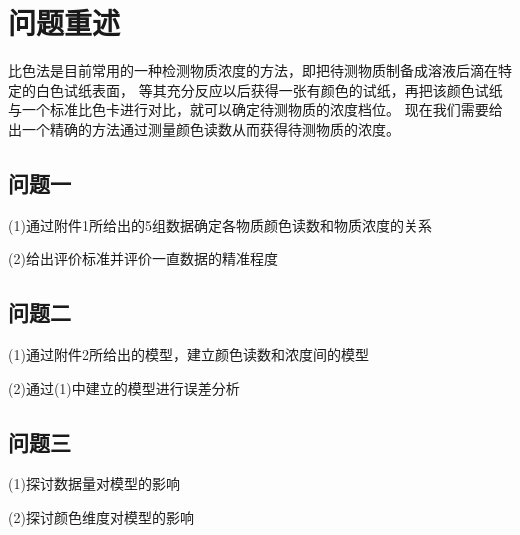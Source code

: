 \section{问题重述}
比色法是目前常用的一种检测物质浓度的方法，即把待测物质制备成溶液后滴在特定的白色试纸表面，
等其充分反应以后获得一张有颜色的试纸，再把该颜色试纸与一个标准比色卡进行对比，就可以确定待测物质的浓度档位。
现在我们需要给出一个精确的方法通过测量颜色读数从而获得待测物质的浓度。
\subsection{问题一}
(1)通过附件1所给出的5组数据确定各物质颜色读数和物质浓度的关系

(2)给出评价标准并评价一直数据的精准程度

\subsection{问题二}
(1)通过附件2所给出的模型，建立颜色读数和浓度间的模型

(2)通过(1)中建立的模型进行误差分析

\subsection{问题三}
(1)探讨数据量对模型的影响

(2)探讨颜色维度对模型的影响

